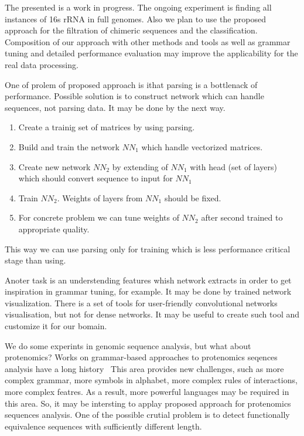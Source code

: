 \documentclass[a4paper,twoside]{article}
\begin{document}
\noindent The presented is a work in progress. 
The ongoing experiment is finding all instances of 16s rRNA in full genomes.
Also we plan to use the proposed approach for the filtration of chimeric sequences and the classification.
Composition of our approach with other methods and tools as well as grammar tuning and detailed performance evaluation may improve the applicability for the real data processing.

One of prolem of proposed approach is ithat parsing is a bottlenack of performance.
Possible solution is to construct network which can handle sequences, not parsing data.
It may be done by the next way.
\begin{enumerate}
\item Create a trainig set of matrices by using parsing.
\item Build and train the network $NN_1$ which handle vectorized matrices.
\item Create new network $NN_2$ by extending  of $NN_1$ with head (set of layers) which should convert sequence to input for $NN_1$
\item Train $NN_2$. Weights of layers from $NN_1$ should be fixed.
\item For concrete problem we can tune weights of $NN_2$ after second trained to appropriate quality.
\end{enumerate}
This way we can use parsing only for training which is less performance critical stage than using.

Anoter task is an understending features whish network extracts in order to get inspiration in grammar tuning, for example.
It may be done by trained network visualization.
There is a set of tools for user-friendly convolutional networks visualisation, but not for dense networks.
It may be useful to create such tool and customize it for our bomain.

We do some experints in genomic sequence analysis, but what about protenomics?
Works on grammar-based approaches to protenomics seqences analysis have a long history~\cite{Jimenez-Montaño1984,Dyrka2008ASC,Sciacca2011AnnotatedSC,DBLP:Witold:Proteins}
This area provides new challenges, such as more complex grammar, more symbols in alphabet, more complex rules of interactions, more complex featres.
As a result, more powerful languages may be required in this area.
So, it may be intersting to applay proposed approach for protenomics sequences analysis.
One of the possible crutial problem is to detect functionally equivalence sequences with sufficiently different length.
\end{document}

